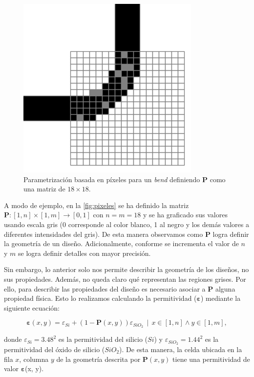 \begin{figure}[h]
  \centering
  \includegraphics[scale=0.7]{image/theory/parametrization-pixeles.png}
  \caption{Parametrización basada en píxeles para un \emph{bend} definiendo $\boldsymbol{P}$ como una matriz de $18 \times 18$.}
  \label{fig:pixeles}
\end{figure}

A modo de ejemplo, en la \autoref{fig:pixeles} se ha definido la matriz $\boldsymbol{P}: [1, n] \times [1, m]
\to [0, 1]$ con $n = m = 18$ y se ha graficado sus valores
usando escala gris (0 corresponde al color blanco, 1 al negro y los demás valores a diferentes
intensidades del gris). De esta manera observamos como $\boldsymbol{P}$ logra definir la geometría de un
diseño.
Adicionalmente, conforme se incrementa el valor de $n$ y $m$ se logra definir detalles con mayor precisión.


Sin embargo, lo anterior solo nos permite describir la geometría de los diseños, no sus propiedades.
Además, no queda claro qué representan las regiones grises.
Por ello, para describir las propiedades del diseño es necesario asociar a $\boldsymbol{P}$ alguna propiedad física.
Esto lo realizamos calculando la permitividad ($\boldsymbol{\varepsilon}$) mediante la siguiente ecuación:

\begin{equation}
  \boldsymbol{\varepsilon}(x, y) = \varepsilon_{Si} + (1 - \boldsymbol{P}(x, y))
  \varepsilon_{SiO_2} \, \mid \, x \in [1, n] \land y \in [1, m],
\label{eq:permitivity}
\end{equation}

\noindent donde $\varepsilon_{Si} = 3.48^2$ es la permitividad del silicio ($Si$) y
$\varepsilon_{SiO_2} = 1.44^2$ es la permitividad del óxido de silicio ($SiO_2$).
De esta manera, la celda ubicada en la fila $x$, columna $y$ de la geometría descrita por 
$\boldsymbol{P}(x, y)$ tiene una permitividad de valor $\boldsymbol{\varepsilon}$(x, y).

